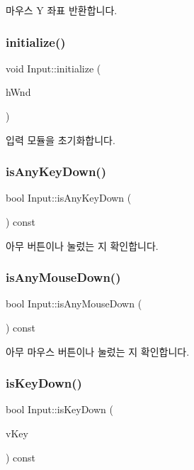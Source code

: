 마우스 Y 좌표 반환합니다. \mbox{\label{class_input_a6a6b22db894128d4bb3c4b15066e6ad6}} 
\subsubsection{\texorpdfstring{initialize()}{initialize()}}
{\footnotesize\ttfamily void Input\+::initialize (\begin{DoxyParamCaption}\item[{H\+W\+ND}]{h\+Wnd }\end{DoxyParamCaption})}

입력 모듈을 초기화합니다. \mbox{\label{class_input_a99501c309c9c78ed1db9a63fdf53110e}} 
\subsubsection{\texorpdfstring{isAnyKeyDown()}{isAnyKeyDown()}}
{\footnotesize\ttfamily bool Input\+::is\+Any\+Key\+Down (\begin{DoxyParamCaption}{ }\end{DoxyParamCaption}) const}

아무 버튼이나 눌렀는 지 확인합니다. \mbox{\label{class_input_af9f8f40d0a19843f11e9a9a201b6a806}} 
\subsubsection{\texorpdfstring{isAnyMouseDown()}{isAnyMouseDown()}}
{\footnotesize\ttfamily bool Input\+::is\+Any\+Mouse\+Down (\begin{DoxyParamCaption}{ }\end{DoxyParamCaption}) const}

아무 마우스 버튼이나 눌렀는 지 확인합니다. \mbox{\label{class_input_ad1f7bdecf93d675bab7469779719d4a5}} 
\subsubsection{\texorpdfstring{isKeyDown()}{isKeyDown()}}
{\footnotesize\ttfamily bool Input\+::is\+Key\+Down (\begin{DoxyParamCaption}\item[{int}]{v\+Key }\end{DoxyParamCaption}) const}

